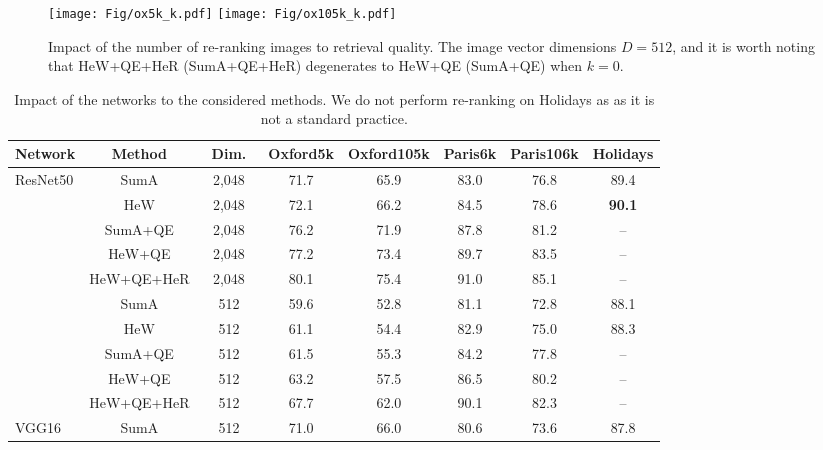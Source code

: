 \documentclass[journal]{IEEEtran}
\begin{document}
\begin{figure}[t]
\centering
\texttt{[image: Fig/ox5k\_k.pdf]}
\texttt{[image: Fig/ox105k\_k.pdf]}
\caption{Impact of the number of re-ranking images to retrieval quality. The image vector dimensions $D=512$, and it is worth noting that  HeW+QE+HeR (SumA+QE+HeR) degenerates to  HeW+QE (SumA+QE) when $k=0$.}
\label{fig:k}
\end{figure}

\begin{table*}[t]
\begin{center}
\caption{Impact of the networks to the considered methods. We do not perform re-ranking on Holidays as as it is not a standard practice.}\label{comparison_with_baseline}
\begin{tabular}{|l|c|c| c c c c c|}
  \hline
  Network                    &Method             &~Dim.~  &Oxford5k  &Oxford105k  &Paris6k  &Paris106k &Holidays \\
  \hline
  \hline
  \multirow{10}{*}{ResNet50} &SumA               &2,048    &71.7  &65.9    &83.0     &76.8          &89.4\\
                             &HeW                &2,048    &72.1  &66.2    &84.5     &78.6          &\textbf{90.1}  \\
                             &SumA+QE            &2,048    &76.2  &71.9    &87.8     &81.2          &-- \\
                             &HeW+QE             &2,048    &77.2  &73.4    &89.7     &83.5          &--  \\
                             &HeW+QE+HeR         &2,048    &80.1  &75.4    &91.0     &85.1          &--  \\
                             \cline{2-8}
                             &SumA               &512     &59.6  &52.8    &81.1     &72.8          &88.1 \\
                             &HeW                &512     &61.1  &54.4    &82.9     &75.0          &88.3  \\
                             &SumA+QE            &512     &61.5  &55.3    &84.2     &77.8          &-- \\
                             &HeW+QE             &512     &63.2  &57.5    &86.5     &80.2          &--  \\
                             &HeW+QE+HeR         &512     &67.7  &62.0    &90.1     &82.3          &-- \\
  \hline
  \multirow{5}{*}{VGG16}     &SumA               &512     &71.0  &66.0        &80.6     &73.6      &87.8  \\

\end{tabular}
\end{center}
\end{table*}
\end{document}
